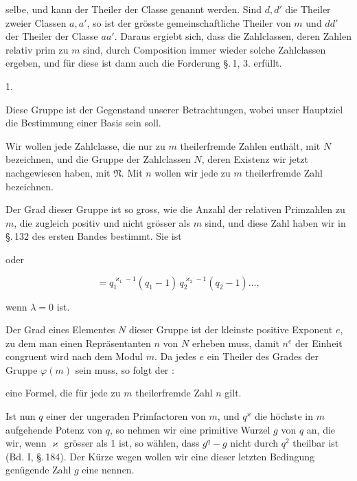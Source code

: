 selbe, und kann der Theiler der Classe genannt werden. Sind $d, d'$ die Theiler zweier Classen $a, a'$, so ist der grösste gemeinschaftliche Theiler von $m$ und $dd'$ der Theiler der Classe $aa'$. Daraus ergiebt sich, dass die Zahlclassen, deren Zahlen relativ prim zu $m$ sind, durch Composition immer wieder solche Zahlclassen ergeben, und für diese ist dann auch die Forderung \S.\,1, 3. erfüllt.

1.\ 

Diese Gruppe ist der Gegenstand unserer Betrachtungen, wobei unser Hauptziel die Bestimmung einer Basis sein soll.

Wir wollen jede Zahlclasse, die nur zu $m$ theilerfremde Zahlen enthält, mit $N$ bezeichnen, und die Gruppe der Zahlclassen $N$, deren Existenz wir jetzt nachgewiesen haben, mit $\mathfrak{N}$. Mit $n$ wollen wir jede zu $m$ theilerfremde Zahl bezeichnen.

Der Grad dieser Gruppe ist so gross, wie die Anzahl der relativen Primzahlen zu $m$, die zugleich positiv und nicht grösser als $m$ sind, und diese Zahl haben wir in \S.\,132 des ersten Bandes bestimmt. Sie ist


oder

\[
= q_1^{\varkappa_1 - 1}(q_1 - 1)\, q_2^{\varkappa_2 - 1}(q_2 - 1) \ldots,
\]

wenn $\lambda = 0$ ist.

Der Grad eines Elementes $N$ dieser Gruppe ist der kleinste positive Exponent $e$, zu dem man einen Repräsentanten $n$ von $N$ erheben muss, damit $n^e$ der Einheit congruent wird nach dem Modul $m$. Da jedes $e$ ein Theiler des Grades der Gruppe $\varphi(m)$ sein muss, so folgt der :


eine Formel, die für jede zu $m$ theilerfremde Zahl $n$ gilt.

Ist nun $q$ einer der ungeraden Primfactoren von $m$, und $q^\varkappa$ die höchste in $m$ aufgehende Potenz von $q$, so nehmen wir eine primitive Wurzel $g$ von $q$ an, die wir, wenn $\varkappa$ grösser als 1 ist, so wählen, dass $g^q - g$ nicht durch $q^2$ theilbar ist (Bd. I, \S.\,184). Der Kürze wegen wollen wir eine dieser letzten Bedingung genügende Zahl $g$ eine  nennen.

